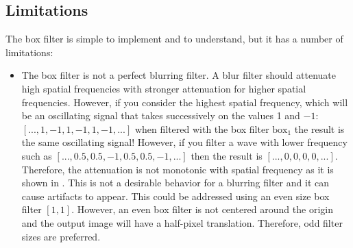 \subsection{Limitations}

The box filter is simple to implement and to understand, but it has a number of limitations:

\begin{itemize}
	\item {The box filter is not a perfect blurring filter. A blur filter should attenuate high spatial frequencies with stronger attenuation for higher spatial frequencies. However, if you consider the highest spatial frequency, which will be an oscillating signal that takes successively on the values 1 and $-1$: $\left[..., 1, -1, 1, -1, 1, -1, ... \right]$ when filtered with the box filter $\text{box}_{1}$ the result is the same oscillating signal! However, if you filter a wave with lower frequency such as $\left[..., 0.5, 0.5, -1, 0.5, 0.5, -1, ... \right]$ then the result is $\left[..., 0,0,0,0, ...\right]$. Therefore, the attenuation is not monotonic with spatial frequency as it is shown in \fig{\ref{fig:boxfilter}}. This is not a desirable behavior for a blurring filter and it can cause artifacts to appear. This could be addressed using an even size box filter $\left[1,1 \right]$. However, an even box filter is not centered around the origin and the output image will have a half-pixel translation. Therefore, odd filter sizes are preferred.}


\end{itemize}
